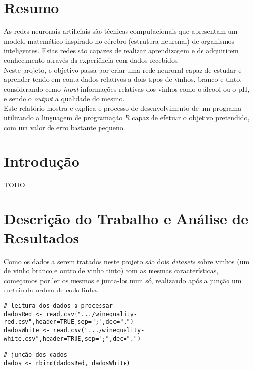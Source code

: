 \documentclass{article}
\begin{document}
\section{Resumo}
As redes neuronais artificiais são técnicas computacionais que apresentam um modelo matemático inspirado no cérebro (estrutura neuronal) de organismos inteligentes. Estas redes são capazes de realizar aprendizagem e de adquirirem conhecimento através da experiência com dados recebidos.\\
Neste projeto, o objetivo passa por criar uma rede neuronal capaz de estudar e aprender tendo em conta dados relativos a dois tipos de vinhos, branco e tinto, considerando como \textit{input} informações relativas dos vinhos como o álcool ou o pH, e sendo o \textit{output} a qualidade do mesmo.\\
Este relatório mostra e explica o processo de desenvolvimento de um programa utilizando a linguagem de programação $R$ capaz de efetuar o objetivo pretendido, com um valor de erro bastante pequeno.  

\vspace*{\fill}

\newpage

\vspace*{\fill}
\tableofcontents
\vspace*{\fill}

\newpage

\vspace*{\fill}
\section{Introdução}
{\color{red}TODO}
\vspace*{\fill}

\newpage

\section{Descrição do Trabalho e Análise de Resultados}

Como os dados a serem tratados neste projeto são dois \textit{datasets} sobre vinhos (um de vinho branco e outro de vinho tinto) com as mesmas características, começamos por ler os mesmos e junta-los num só, realizando após a junção um sorteio da ordem de cada linha.

\begin{verbatim}
# leitura dos dados a processar
dadosRed <- read.csv(".../winequality-red.csv",header=TRUE,sep=";",dec=".")
dadosWhite <- read.csv(".../winequality-white.csv",header=TRUE,sep=";",dec=".")

# junção dos dados
dados <- rbind(dadosRed, dadosWhite)
\end{verbatim}
\end{document}
